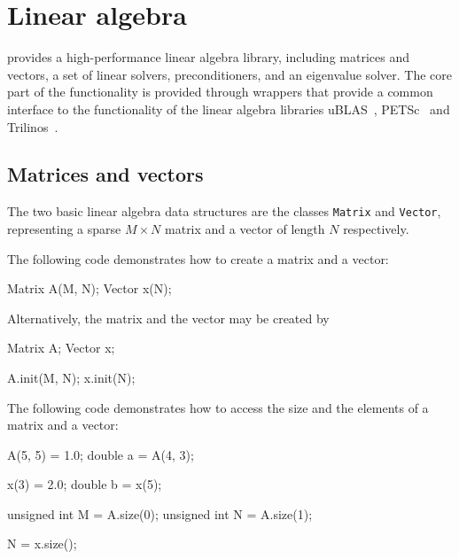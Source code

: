 \chapter{Linear algebra}


\dolfin{} provides a high-performance linear algebra library,
including matrices and vectors, a set of linear solvers,
preconditioners, and an eigenvalue solver. The core part of the
functionality is provided through wrappers that provide a common
interface to the functionality of the linear algebra libraries
uBLAS~\cite{www:ublas}, PETSc~\cite{www:petsc} and 
Trilinos~\cite{www.trilonos}.

\section{Matrices and vectors}

The two basic linear algebra data structures are the classes
\texttt{Matrix} and \texttt{Vector}, representing a sparse $M\times
N$ matrix and a vector of length $N$ respectively.

The following code demonstrates how to create a matrix and a vector:
\begin{code}
Matrix A(M, N);
Vector x(N);
\end{code}
Alternatively, the matrix and the vector may be created by
\begin{code}
Matrix A;
Vector x;

A.init(M, N);
x.init(N);
\end{code}

The following code demonstrates how to access the size and the
elements of a matrix and a vector:
\begin{code}
A(5, 5) = 1.0;
double a = A(4, 3);

x(3) = 2.0;
double b = x(5);

unsigned int M = A.size(0);
unsigned int N = A.size(1);

N = x.size();
\end{code}

